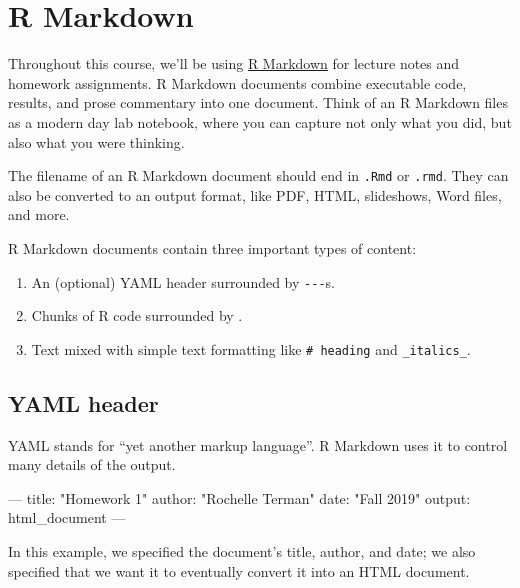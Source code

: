 \documentclass[]{book}
\newenvironment{Shaded}{\begin{snugshade}}{\end{snugshade}}
\newcommand{\NormalTok}[1]{#1}
\providecommand{\tightlist}{%
  \setlength{\itemsep}{0pt}\setlength{\parskip}{0pt}}
\begin{document}
\hypertarget{r-markdown}{%
\section{R Markdown}\label{r-markdown}}

Throughout this course, we'll be using \href{http://rmarkdown.rstudio.com\%3E}{R Markdown} for lecture notes and homework assignments. R Markdown documents combine executable code, results, and prose commentary into one document. Think of an R Markdown files as a modern day lab notebook, where you can capture not only what you did, but also what you were thinking.

The filename of an R Markdown document should end in \texttt{.Rmd} or \texttt{.rmd}. They can also be converted to an output format, like PDF, HTML, slideshows, Word files, and more.

R Markdown documents contain three important types of content:

\begin{enumerate}
\def\labelenumi{\arabic{enumi}.}
\tightlist
\item
  An (optional) YAML header surrounded by \texttt{-\/-\/-}s.
\item
  Chunks of R code surrounded by \texttt{\textasciigrave{}\textasciigrave{}\textasciigrave{}}.
\item
  Text mixed with simple text formatting like \texttt{\#\ heading} and \texttt{\_italics\_}.
\end{enumerate}

\hypertarget{yaml-header}{%
\subsection{YAML header}\label{yaml-header}}

YAML stands for ``yet another markup language''. R Markdown uses it to control many details of the output.

\begin{Shaded}
\begin{Highlighting}[]
\NormalTok{---}
\NormalTok{title: "Homework 1"}
\NormalTok{author: "Rochelle Terman"}
\NormalTok{date: "Fall 2019"}
\NormalTok{output: html_document}
\NormalTok{---}
\end{Highlighting}
\end{Shaded}

In this example, we specified the document's title, author, and date; we also specified that we want it to eventually convert it into an HTML document.
\end{document}
